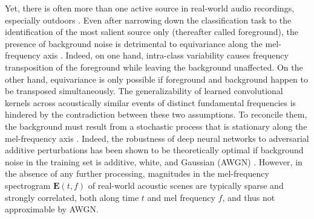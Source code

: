 \documentclass[journal]{IEEEtran}
\theoremstyle{remark}
\begin{document}
Yet, there is often more than one active source in real-world audio recordings, especially outdoors \cite{mesaros2015applied}.
Even after narrowing down the classification task to the identification of the most salient source only (thereafter called foreground), the presence of background noise is detrimental to equivariance along the mel-frequency axis \cite{salamon2017spl}.
Indeed, on one hand, intra-class variability causes frequency transposition of the foreground while leaving the background unaffected.
On the other hand, equivariance is only possible if foreground and background happen to be transposed simultaneously.
The generalizability of learned convolutional kernels across acoustically similar events of distinct fundamental frequencies is hindered by the contradiction between these two assumptions.
To reconcile them, the background must result from a stochastic process that is stationary along the mel-frequency axis \cite{badeau2016techreport}.
Indeed, the robustness of deep neural networks to adversarial additive perturbations has been shown to be theoretically optimal if background noise in the training set is additive, white, and Gaussian (AWGN) \cite{franceschi2018aistats}.
However, in the absence of any further processing, magnitudes in the mel-frequency spectrogram $\mathbf{E}(t, f)$ of real-world acoustic scenes are typically sparse and strongly correlated, both along time $t$ and mel frequency $f $\cite{mcdermott2011neuron}, and thus not approximable by AWGN. 
 
\end{document}
